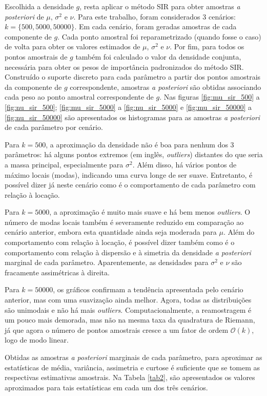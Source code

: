 Escolhida a densidade $g$, resta aplicar o método SIR para obter amostras \textit{a posteriori} de $\mu$, $\sigma^2$ e $\nu$. Para este trabalho, foram considerados 3 cenários: $k = \{500, 5000, 50000\}$. Em cada cenário, foram geradas amostras de cada componente de $g$. Cada ponto amostral foi reparametrizado (quando fosse o caso) de volta para obter os valores estimados de $\mu$, $\sigma^2$ e $\nu$. Por fim, para todos os pontos amostrais de $g$ também foi calculado o valor da densidade conjunta, necessária para obter os pesos de importância padronizados do método SIR. Construído o suporte discreto para cada parâmetro a partir dos pontos amostrais da componente de $g$ correspondente, amostras \textit{a posteriori} são obtidas associando cada peso ao ponto amostral correspondente de $g$. Nas figuras \ref{fig:mu_sir_500} a \ref{fig:nu_sir_500}; \ref{fig:mu_sir_5000} a \ref{fig:nu_sir_5000} e \ref{fig:mu_sir_50000} a \ref{fig:nu_sir_50000} são apresentados os histogramas para as amostras \textit{a posteriori} de cada parâmetro por cenário.

Para $k=500$, a aproximação da densidade não é boa para nenhum dos 3 parâmetros: há alguns pontos extremos (em inglês, \textit{outliers}) distantes do que seria a massa principal, especialmente para $\sigma^2$. Além disso, há vários pontos de máximo locais (modas), indicando uma curva longe de ser suave. Entretanto, é possível dizer já neste cenário como é o comportamento de cada parâmetro com relação à locação.

Para $k=5000$, a aproximação é muito mais suave e há bem menos \textit{outliers}. O número de modas locais também é severamente reduzido em comparação ao cenário anterior, embora esta quantidade ainda seja moderada para $\mu$. Além do comportamento com relação à locação, é possível dizer também como é o comportamento com relação à dispersão e à simetria da densidade \textit{a posteriori} marginal de cada parâmetro. Aparentemente, as densidades para $\sigma^2$ e $\nu$ são fracamente assimétricas à direita.

Para $k=50000$, os gráficos confirmam a tendência apresentada pelo cenário anterior, mas com uma suavização ainda melhor. Agora, todas as distribuições são unimodais e não há mais \textit{outliers}. Computacionalmente, a reamostragem é um pouco mais demorada, mas não na mesma taxa da quadratura de Riemann, já que agora o número de pontos amostrais cresce a um fator de ordem $\mathcal{O}(k)$, logo de modo linear.

Obtidas as amostras \textit{a posteriori} marginais de cada parâmetro, para aproximar as estatísticas de média, variância, assimetria e curtose é suficiente que se tomem as respectivas estimativas amostrais. Na Tabela \ref{tab2}, são apresentados os valores aproximados para tais estatísticas em cada um dos três cenários.

